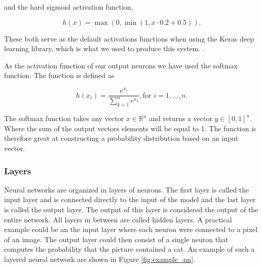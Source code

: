and the hard sigmoid activation function,

\begin{equation}\label{eq:h_sig}
    h(x) = \max(0, \min(1, x \cdot 0.2 + 0.5)).
\end{equation}

These both serve as the default activations functions when using the Keras
deep learning library, which is what we used to produce this system.
\cite{chollet2015keras}.

As the activation function of our output neurons we have used the softmax
function. The function is defined as

\begin{equation}
    h(x_i) = \frac{e^{x_i}}{\sum_{k=1}^n e^{x_k}}, \text{for $i = 1,\dots,n$}.
\end{equation}

The softmax function takes any vector $x \in \mathbb{R}^n$ and returns a vector
$y \in [0, 1]^n$. Where the sum of the output vectors elements will be equal to
1. The function is therefore great at constructing a probability distribution
based on an input vector.

\subsubsection{Layers} \label{subsubsec:layers}

Neural networks are organized in layers of neurons. The first layer is called
the input layer and is connected directly to the input of the model and the last
layer is called the output layer. The output of this layer is considered the
output of the entire network. All layers in between are called hidden layers. A
practical example could be an the input layer where each neuron were connected
to a pixel of an image. The output layer could then consist of a single neuron
that computes the probability that the picture contained a cat. An example of
such a layered neural network are shown in Figure \ref{fig:example_nn}.

